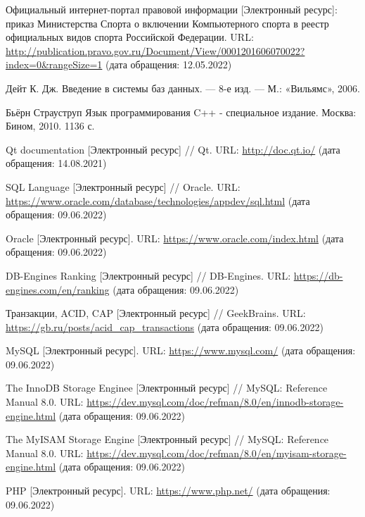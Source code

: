 
\begin{thebibliography}{1}
	Официальный интернет-портал правовой информации [Электронный ресурс]:
	приказ Министерства Спорта о включении Компьютерного спорта в реестр официальных видов спорта Российской Федерации.
	URL: \url{http://publication.pravo.gov.ru/Document/View/0001201606070022?index=0&rangeSize=1}
	(дата обращения: 12.05.2022)
	
	Дейт К. Дж. Введение в системы баз данных. — 8-е изд. — М.: «Вильямс», 2006.
	
	Бьёрн Страуструп Язык программирования C++ - специальное издание. Москва: Бином, 2010. 1136 с.
	
	Qt documentation [Электронный ресурс] // Qt.
	URL: \url{http://doc.qt.io/}
	(дата обращения: 14.08.2021)
	
	SQL Language  [Электронный ресурс] // Oracle.
	URL: \url{https://www.oracle.com/database/technologies/appdev/sql.html}
	(дата обращения: 09.06.2022)
	
	Oracle [Электронный ресурс].
	URL: \url{https://www.oracle.com/index.html}
	(дата обращения: 09.06.2022)
	
	DB-Engines Ranking [Электронный ресурс] // DB-Engines.
	URL: \url{https://db-engines.com/en/ranking}
	(дата обращения: 09.06.2022)
	
	Транзакции, ACID, CAP [Электронный ресурс] // GeekBrains.
	URL: \url{https://gb.ru/posts/acid_cap_transactions}
	(дата обращения: 09.06.2022)
	
	MySQL [Электронный ресурс].
	URL: \url{https://www.mysql.com/}
	(дата обращения: 09.06.2022)
	
	The InnoDB Storage Enginee [Электронный ресурс] // MySQL: Reference Manual 8.0.
	URL: \url{https://dev.mysql.com/doc/refman/8.0/en/innodb-storage-engine.html}
	(дата обращения: 09.06.2022)
	
	The MyISAM Storage Engine [Электронный ресурс] // MySQL: Reference Manual 8.0.
	URL: \url{https://dev.mysql.com/doc/refman/8.0/en/myisam-storage-engine.html}
	(дата обращения: 09.06.2022)
	
	PHP [Электронный ресурс].
	URL: \url{https://www.php.net/}
	(дата обращения: 09.06.2022)
	

\end{thebibliography}
